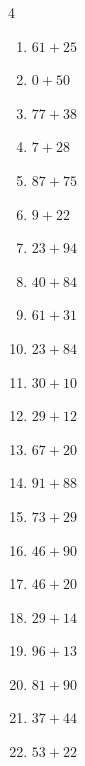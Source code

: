 \begin{multicols}{4}
\begin{enumerate}
  \item $61+25$
        \phantom{$=86$}

  \item $0+50$
        \phantom{$=50$}

  \item $77+38$
        \phantom{$=115$}

  \item $7+28$
        \phantom{$=35$}

  \item $87+75$
        \phantom{$=162$}

  \item $9+22$
        \phantom{$=31$}

  \item $23+94$
        \phantom{$=117$}

  \item $40+84$
        \phantom{$=124$}

  \item $61+31$
        \phantom{$=92$}

  \item $23+84$
        \phantom{$=107$}

  \item $30+10$
        \phantom{$=40$}

  \item $29+12$
        \phantom{$=41$}

  \item $67+20$
        \phantom{$=87$}

  \item $91+88$
        \phantom{$=179$}

  \item $73+29$
        \phantom{$=102$}

  \item $46+90$
        \phantom{$=136$}

  \item $46+20$
        \phantom{$=66$}

  \item $29+14$
        \phantom{$=43$}

  \item $96+13$
        \phantom{$=109$}

  \item $81+90$
        \phantom{$=171$}

  \item $37+44$
        \phantom{$=81$}

  \item $53+22$
        \phantom{$=75$}


\end{enumerate}
\end{multicols}
